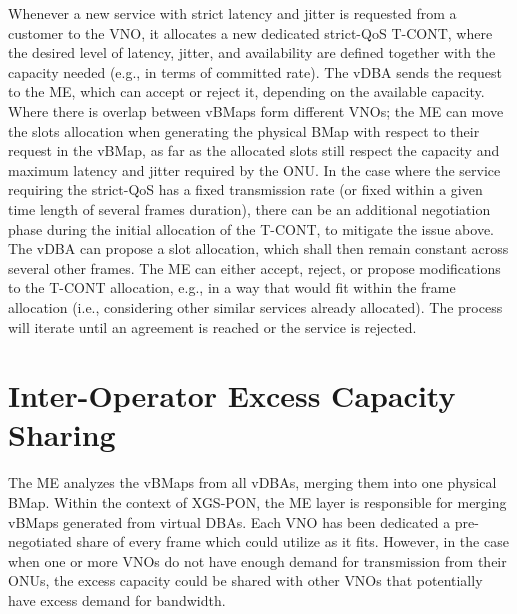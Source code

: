  Whenever a new service with strict latency and jitter is requested from a customer to the \ac{VNO}, it allocates a new dedicated strict-\ac{QoS} \ac{T-CONT}, where the desired level of latency, jitter, and availability are defined together with the capacity needed (e.g., in terms of committed rate). The \ac{vDBA} sends the request to the \ac{ME}, which can accept or reject it, depending on the available capacity. Where there is overlap between \acp{vBMap} form different \acp{VNO}; the \ac{ME} can move the slots allocation when generating the physical \ac{BMap} with respect to their request in the \ac{vBMap}, as far as the allocated slots still respect the capacity and maximum latency and jitter required by the \ac{ONU}. In the case where the service requiring the strict-\ac{QoS} has a fixed transmission rate (or fixed within a given time length of several frames duration), there can be an additional negotiation phase during the initial allocation of the \ac{T-CONT}, to mitigate the issue above. The \ac{vDBA} can propose a slot allocation, which shall then remain constant across several other frames. The \ac{ME} can either accept, reject, or propose modifications to the \ac{T-CONT} allocation, e.g., in a way that would fit within the frame allocation (i.e., considering other similar services already allocated). The process will iterate until an agreement is reached or the service is rejected.



\section{Inter-Operator Excess Capacity Sharing}
The \ac{ME} analyzes the \acp{vBMap} from all \acp{vDBA}, merging them into one physical \ac{BMap}. Within the context of XGS-PON, the \ac{ME} layer is responsible for merging \acp{vBMap} generated from virtual \acp{DBA}. Each \ac{VNO} has been dedicated a pre-negotiated share of every frame which could utilize as it fits. However, in the case when one or more \acp{VNO} do not have enough demand for transmission from their \acp{ONU}, the excess capacity could be shared with other \acp{VNO} that potentially have excess demand for bandwidth.

